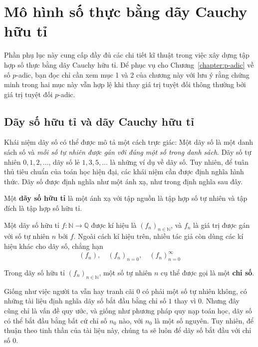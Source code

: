 \chapter{Mô hình số thực bằng dãy Cauchy hữu tỉ}

Phần phụ lục này cung cấp đầy đủ các chi tiết kĩ thuật trong việc xây dựng tập hợp số thực bằng dãy Cauchy hữu tỉ. Để phục vụ cho Chương~\ref{chapter:p-adic} về số $p$-adic, bạn đọc chỉ cần xem mục 1 và 2 của chương này với lưu ý rằng chứng minh trong hai mục này vẫn hợp lệ khi thay giá trị tuyệt đối thông thường bởi giá trị tuyệt đối $p$-adic.

\section{Dãy số hữu tỉ và dãy Cauchy hữu tỉ}\label{section:rational-sequences-and-rational-cauchy-sequences}

Khái niệm dãy số có thể được mô tả một cách trực giác: Một dãy số là một danh sách số và \textit{mỗi số tự nhiên được gán với đúng một số trong danh sách}. Dãy số tự nhiên $0, 1, 2, \ldots$, dãy số lẻ $1, 3, 5, \ldots$ là những ví dụ về dãy số. Tuy nhiên, để tuân thủ tiêu chuẩn của toán học hiện đại, các khái niệm cần được định nghĩa hình thức. Dãy số được định nghĩa như một ánh xạ, như trong định nghĩa sau đây.

\begin{definition}
    Một \textbf{dãy số hữu tỉ} là một ánh xạ với tập nguồn là tập hợp số tự nhiên và tập đích là tập hợp số hữu tỉ.

    \noindent Một dãy số hữu tỉ $f: \mathbb{N}\to\mathbb{Q}$ được kí hiệu là ${(f_{n})}_{n\in\mathbb{N}}$, và $f_{n}$ là giá trị được gán với số tự nhiên $n$ bởi $f$. Ngoài cách kí hiệu trên, nhiều tác giả còn dùng các kí hiệu khác cho dãy số, chẳng hạn
    \[
        {(f_{n})}, \quad {(f_{n})}_{n=0}, \quad {(f_{n})}^{\infty}_{n=0}
    \]

    \noindent Trong dãy số hữu tỉ ${(f_{n})}_{n\in\mathbb{N}}$, một số tự nhiên $n$ cụ thể được gọi là một \textbf{chỉ số}.
\end{definition}

Giống như việc người ta vẫn hay tranh cãi $0$ có phải một số tự nhiên không, có những tài liệu định nghĩa dãy số bắt đầu bằng chỉ số $1$ thay vì $0$. Nhưng đây cũng chỉ là vấn đề quy ước, và giống như phương pháp quy nạp toán học, dãy số có thể bắt đầu bằng bất cứ chỉ số $n_{0}$ nào, với $n_{0}$ là một số nguyên. Tuy nhiên, để thuận theo tinh thần của tài liệu này, chúng ta sẽ luôn để dãy số bắt đầu với chỉ số $0$.

